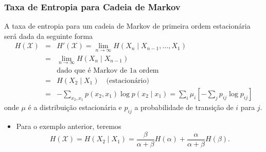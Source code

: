 \begin{frame}[allowframebreaks]
  \frametitle{Taxa de Entropia para Cadeia de Markov}
  A taxa de entropia para um cadeia de Markov de primeira ordem estacionária será dada da seguinte forma
  \begin{eqnarray}
  H(\mathcal{X}) &=& H'(\mathcal{X}) = \lim_{n \rightarrow \infty} H(X_n \mid X_{n-1}, \ldots, X_1) \nonumber \\
	&=& \lim_{n \rightarrow \infty} H(X_n \mid X_{n-1}) \nonumber \\
	&& \text{dado que é Markov de 1a ordem} \nonumber \nonumber \\
	&=& H(X_2 \mid X_1) \quad \text{(estacionário)} \nonumber \\
	&=& - \sum_{x_2, x_1} p(x_2, x_1) \log p(x_2 \mid x_1) = \sum_i \mu_i \left[ - \sum_j p_{ij} \log p_{ij} \right] \nonumber
  \end{eqnarray}
  onde $\mu$ é a distribuição estacionária e $p_{ij}$ a probabilidade de transição de $i$ para $j$.

  \begin{itemize}
  \item Para o exemplo anterior, teremos
	\begin{equation}
	H(\mathcal{X}) = H(X_2 \mid X_1) = \frac{\beta}{\alpha + \beta} H(\alpha) + \frac{\alpha}{\alpha + \beta} H(\beta) .
	\end{equation}
  \end{itemize}
\end{frame}


